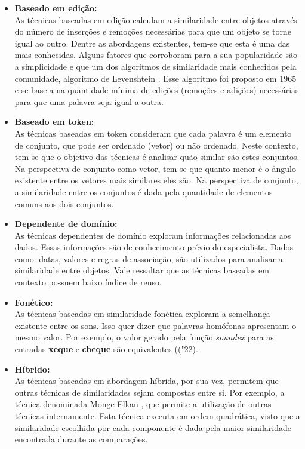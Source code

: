 \begin{itemize}
	\item \textbf{Baseado em edição:}\\
	As técnicas baseadas em edição calculam a similaridade entre objetos através do número de inserções e remoções necessárias para que um objeto se torne igual ao outro. 
	Dentre as abordagens existentes, tem-se que esta é uma das mais conhecidas. Alguns fatores que corroboram para a sua popularidade são a simplicidade e que um dos algoritmos de similaridade mais conhecidos pela comunidade, algoritmo de Levenshtein \cite{levenshtein1966binary}. Esse algoritmo foi proposto em 1965 e se baseia na quantidade mínima de edições (remoções e adições) necessárias para que uma palavra seja igual a outra.
	
	\item \textbf{Baseado em token:}\\
	As técnicas baseadas em token consideram que cada palavra é um elemento de conjunto, que pode ser ordenado (vetor) ou não ordenado. Neste contexto, tem-se que o objetivo das técnicas é analisar quão similar são estes conjuntos. Na perspectiva de conjunto como vetor, tem-se que quanto menor é o ângulo existente entre os vetores mais similares eles são. Na perspectiva de conjunto, a similaridade entre os conjuntos é dada pela quantidade de elementos comuns aos dois conjuntos.
	
	\item \textbf{Dependente de domínio:}\\
	As técnicas dependentes de domínio exploram informações relacionadas aos dados. Essas informações são de conhecimento prévio do especialista. Dados como: datas, valores e regras de associação, são utilizados para analisar a similaridade entre objetos. Vale ressaltar que as técnicas baseadas em contexto possuem baixo índice de reuso.
	
	\item \textbf{Fonético:}\\
	As técnicas baseadas em similaridade fonética exploram a semelhança existente entre os sons. Isso quer dizer que palavras homófonas apresentam o mesmo valor. Por exemplo, o valor gerado pela função \textit{soundex} para as entradas \textbf{xeque} e \textbf{cheque} são equivalentes (("22).
	
	\item \textbf{Híbrido:}\\
	As técnicas baseadas em abordagem híbrida, por sua vez, permitem que outras técnicas de similaridades sejam compostas entre si. Por exemplo, a técnica denominada Monge-Elkan \cite{monge1996field}, que permite a utilização de outras técnicas internamente. Esta técnica executa em ordem quadrática, visto que a similaridade escolhida por cada componente é dada pela maior similaridade encontrada durante as comparações.
\end{itemize}

